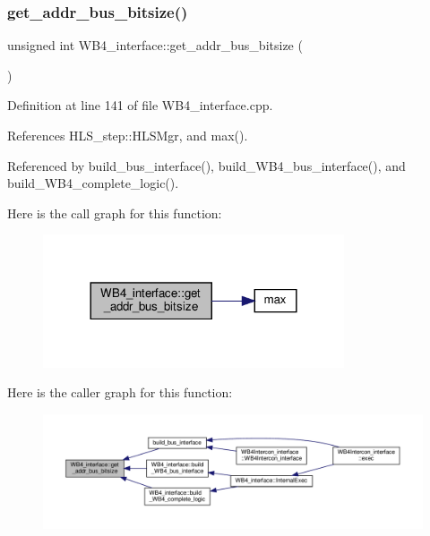 \subsubsection{\texorpdfstring{get\+\_\+addr\+\_\+bus\+\_\+bitsize()}{get\_addr\_bus\_bitsize()}}
{\footnotesize\ttfamily unsigned int W\+B4\+\_\+interface\+::get\+\_\+addr\+\_\+bus\+\_\+bitsize (\begin{DoxyParamCaption}{ }\end{DoxyParamCaption})\hspace{0.3cm}{\ttfamily [protected]}}



Definition at line 141 of file W\+B4\+\_\+interface.\+cpp.



References H\+L\+S\+\_\+step\+::\+H\+L\+S\+Mgr, and max().



Referenced by build\+\_\+bus\+\_\+interface(), build\+\_\+\+W\+B4\+\_\+bus\+\_\+interface(), and build\+\_\+\+W\+B4\+\_\+complete\+\_\+logic().

Here is the call graph for this function\+:
\nopagebreak
\begin{figure}[H]
\begin{center}
\leavevmode
\includegraphics[width=252pt]{d5/d7a/classWB4__interface_abcc03869191ef61861fe936ae8dcd96a_cgraph}
\end{center}
\end{figure}
Here is the caller graph for this function\+:
\nopagebreak
\begin{figure}[H]
\begin{center}
\leavevmode
\includegraphics[width=350pt]{d5/d7a/classWB4__interface_abcc03869191ef61861fe936ae8dcd96a_icgraph}
\end{center}
\end{figure}
\mbox{\label{classWB4__interface_a0ea7f395d607ba25bdb832ee47c0d68c}} 
